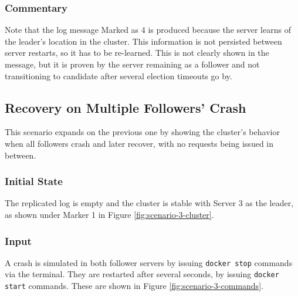 \subsubsection{Commentary}

Note that the log message Marked as 4 is produced because the server learns of the leader's location in the cluster. This information is not persisted between server restarts, so it has to be re-learned. This is not clearly shown in the message, but it is proven by the server remaining as a follower and not transitioning to candidate after several election timeouts go by. 

\subsection{Recovery on Multiple Followers' Crash}

This scenario expands on the previous one by showing the cluster's behavior when all followers crash and later recover, with no requests being issued in between.

\subsubsection{Initial State}

The replicated log is empty and the cluster is stable with Server 3 as the leader, as shown under Marker 1 in Figure \ref{fig:scenario-3-cluster}.

\subsubsection{Input}

A crash is simulated in both follower servers by issuing \lstinline|docker stop| commands via the terminal. They are restarted after several seconds, by issuing \lstinline|docker start| commands. These are shown in Figure \ref{fig:scenario-3-commands}.

